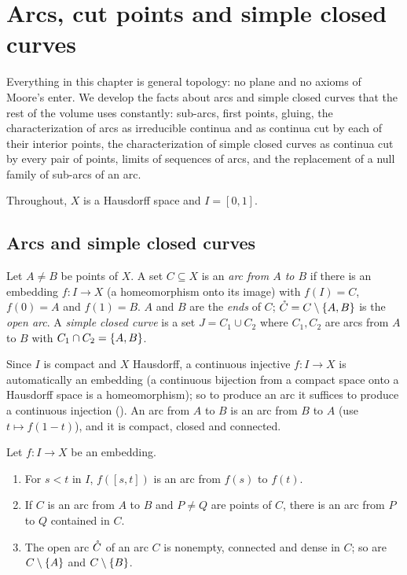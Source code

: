 \chapter{Arcs, cut points and simple closed curves}\label{ch:arcs}

Everything in this chapter is general topology: no plane and no axioms of Moore's enter. We
develop the facts about arcs and simple closed curves that the rest of the volume uses constantly:
sub-arcs, first points, gluing, the characterization of arcs as irreducible continua and as
continua cut by each of their interior points, the characterization of simple closed curves as
continua cut by every pair of points, limits of sequences of arcs, and the replacement of a null
family of sub-arcs of an arc.

Throughout, $X$ is a Hausdorff space and $I=[0,1]$.

\section{Arcs and simple closed curves}

\begin{definition}\label{def:arc}
Let $A\ne B$ be points of $X$. A set $C\subseteq X$ is an \emph{arc from $A$ to $B$} if there is an
embedding $f\colon I\to X$ (a homeomorphism onto its image) with $f(I)=C$, $f(0)=A$ and $f(1)=B$.
$A$ and $B$ are the \emph{ends} of $C$; $\mathring{C}=C\setminus\left\{ A,B \right\}$ is the \emph{open arc}. A
\emph{simple closed curve} is a set $J=C_1\cup C_2$ where $C_1,C_2$ are arcs from $A$ to $B$ with
$C_1\cap C_2=\left\{ A,B \right\}$.
\end{definition}


Since $I$ is compact and $X$ Hausdorff, a continuous injective $f\colon I\to X$ is automatically an
embedding (a continuous bijection from a compact space onto a Hausdorff space is a homeomorphism);
so to produce an arc it suffices to produce a continuous injection ().
An arc from $A$ to $B$ is an arc from $B$ to $A$ (use $t\mapsto f(1-t)$), and it is compact,
closed and connected.

\begin{lemma}\label{lem:subarc}
Let $f\colon I\to X$ be an embedding.
\begin{enumerate}[label=(\alph*)]
\item For $s<t$ in $I$, $f([s,t])$ is an arc from $f(s)$ to $f(t)$.
\item If $C$ is an arc from $A$ to $B$ and $P\ne Q$ are points of $C$, there is an arc from $P$ to
$Q$ contained in $C$.
\item The open arc $\mathring{C}$ of an arc $C$ is nonempty, connected and dense in $C$; so are
$C\setminus\left\{ A \right\}$ and $C\setminus\left\{ B \right\}$.
\end{enumerate}
\end{lemma}

